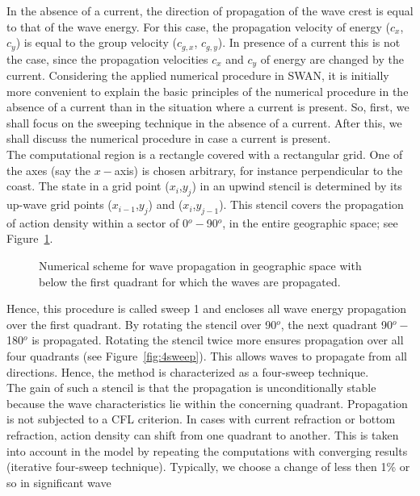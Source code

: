 \documentclass[12pt]{book}
\begin{document}
In the absence of a current, the direction of propagation of the wave crest is equal to that of the wave
energy. For this case, the propagation velocity of energy ($c_x$, $c_y$) is equal
to the group velocity ($c_{g,x}$, $c_{g,y}$). In presence of a current this is not the case, since the propagation
velocities $c_x$ and $c_y$ of energy are changed by the current. Considering the applied numerical procedure
in SWAN, it is initially more convenient to explain the basic principles of the numerical procedure in
the absence of a current than in the situation where a current is present. So, first, we shall focus on
the sweeping technique in the absence of a current. After this, we shall discuss the numerical
procedure in case a current is present.
\\[2ex]
\noindent
The computational region is a rectangle covered with a rectangular grid. One of the axes (say
the $x-$axis) is chosen arbitrary, for instance perpendicular to the coast.
The state in a grid point ($x_i$,$y_j$) in an upwind stencil is determined by its up-wave grid points
($x_{i-1}$,$y_j$) and ($x_i$,$y_{j-1}$). This stencil covers
the propagation of action density within a sector of 0$^o -$90$^o$, in the entire geographic space; see Figure~\ref{fig:fsweep}.
\begin{figure}[htb]
   \centerline{
              }
      \caption{Numerical scheme for wave propagation in geographic space with below the first quadrant for which the waves are propagated.}
      \label{fig:fsweep}
\end{figure}
Hence, this procedure is called
sweep 1 and encloses all wave energy propagation over the first quadrant. By rotating the stencil over
90$^o$, the next quadrant 90$^o -$180$^o$ is propagated. Rotating the stencil twice more ensures propagation over
all four quadrants (see Figure~\ref{fig:4sweep}). This allows waves to propagate from all directions. Hence, the method
is characterized as a four-sweep technique.
\\[2ex]
\noindent
The gain of such a stencil is that the propagation is unconditionally stable because the wave
characteristics lie within the concerning quadrant. Propagation is not subjected to a CFL criterion.
In cases with current refraction or bottom refraction, action density can shift from one quadrant to
another. This is taken into account in the model by repeating the computations with converging results
(iterative four-sweep technique). Typically, we choose a change of less then 1\% or so in significant wave
\end{document}
